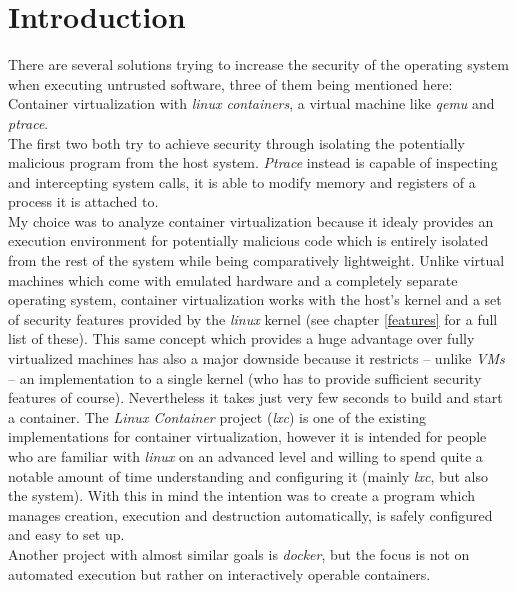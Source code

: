 \chapter{Introduction}

There are several solutions trying to increase the security of the operating system when executing untrusted software,
three of them being mentioned here:\\
Container virtualization with \textit{linux containers}\cite{lxc}, a virtual machine like \textit{qemu}\cite{qemu} and \textit{ptrace}\cite{ptrace}.\\
The first two both try to achieve security through isolating the potentially malicious program from the host system.
\textit{Ptrace} instead is capable of inspecting and intercepting system calls, it is able to modify memory and registers of a process it is attached to.\\
My choice was to analyze container virtualization because it idealy provides an execution environment for
potentially malicious code which is entirely isolated from the rest of the system while being comparatively
lightweight. Unlike virtual machines which come with emulated hardware and a completely separate operating
system, container virtualization works with the host's kernel and a set of security features provided by the
\textit{linux} kernel (see chapter \ref{features} for a full list of these).
This same concept which provides a huge advantage over fully virtualized machines has also a major downside
because it restricts -- unlike  \textit{VMs} -- an implementation to a single kernel (who has to provide sufficient
security features of course). Nevertheless it takes just very few seconds to build and start a container.
The \textit{Linux Container} project (\textit{lxc}) is one of the existing implementations for container virtualization,
however it is intended for people who are familiar
with \textit{linux} on an advanced level and willing to spend quite a notable amount of time understanding and
configuring it (mainly \textit{lxc}, but also the system). With this in mind the intention was to create a program
which manages creation, execution and destruction automatically, is safely configured and easy to set up.\\
Another project with almost similar goals is \textit{docker}\cite{docker}, but the focus is not on automated execution but rather on
interactively operable containers. 